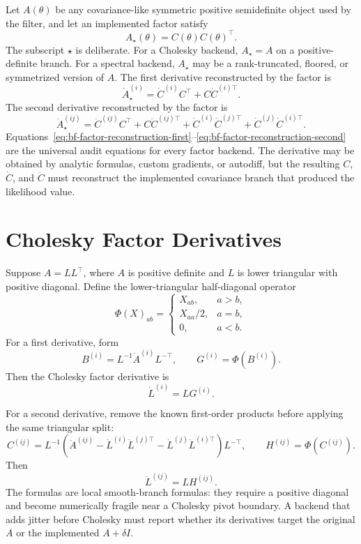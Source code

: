 Let $A(\theta)$ be any covariance-like symmetric positive semidefinite object
used by the filter, and let an implemented factor satisfy
\[
  A_\star(\theta)=C(\theta)C(\theta)^\top .
\]
The subscript $\star$ is deliberate.  For a Cholesky backend,
$A_\star=A$ on a positive-definite branch.  For a spectral backend,
$A_\star$ may be a rank-truncated, floored, or symmetrized version of $A$.
The first derivative reconstructed by the factor is
\begin{equation}
\label{eq:bf-factor-reconstruction-first}
  \dot A_\star^{(i)}
  =
  \dot C^{(i)}C^\top
  +C\dot C^{(i)\top}.
\end{equation}
The second derivative reconstructed by the factor is
\begin{equation}
\label{eq:bf-factor-reconstruction-second}
  \ddot A_\star^{(ij)}
  =
  \ddot C^{(ij)}C^\top
  +C\ddot C^{(ij)\top}
  +\dot C^{(i)}\dot C^{(j)\top}
  +\dot C^{(j)}\dot C^{(i)\top}.
\end{equation}
Equations~\eqref{eq:bf-factor-reconstruction-first}--\eqref{eq:bf-factor-reconstruction-second}
are the universal audit equations for every factor backend.  The derivative may
be obtained by analytic formulas, custom gradients, or autodiff, but the
resulting $C$, $\dot C$, and $\ddot C$ must reconstruct the implemented
covariance branch that produced the likelihood value.

\section{Cholesky Factor Derivatives}
\label{sec:bf-factor-cholesky}

Suppose $A=LL^\top$, where $A$ is positive definite and $L$ is lower triangular
with positive diagonal.  Define the lower-triangular half-diagonal operator
\[
  \Phi(X)_{ab} =
  \begin{cases}
    X_{ab}, & a>b,\\
    X_{aa}/2, & a=b,\\
    0, & a<b.
  \end{cases}
\]
For a first derivative, form
\[
  B^{(i)}=L^{-1}\dot A^{(i)}L^{-\top},\qquad
  G^{(i)}=\Phi\!\left(B^{(i)}\right).
\]
Then the Cholesky factor derivative is
\begin{equation}
\label{eq:bf-factor-cholesky-first}
  \dot L^{(i)} = L G^{(i)}.
\end{equation}

For a second derivative, remove the known first-order products before applying
the same triangular split:
\[
  C^{(ij)}
  =
  L^{-1}\!\left(
    \ddot A^{(ij)}
    -\dot L^{(i)}\dot L^{(j)\top}
    -\dot L^{(j)}\dot L^{(i)\top}
  \right)L^{-\top},
  \qquad
  H^{(ij)}=\Phi\!\left(C^{(ij)}\right).
\]
Then
\begin{equation}
\label{eq:bf-factor-cholesky-second}
  \ddot L^{(ij)} = L H^{(ij)}.
\end{equation}
The formulas are local smooth-branch formulas: they require a positive diagonal and
become numerically fragile near a Cholesky pivot boundary.  A backend that adds
jitter before Cholesky must report whether its derivatives target the original
$A$ or the implemented $A+\delta I$.

